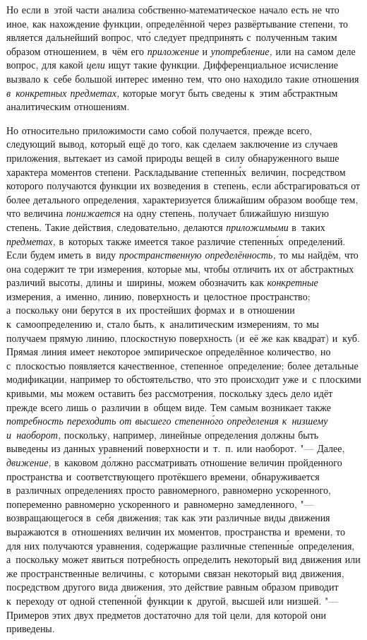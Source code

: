 Но если в~этой части анализа собственно-математическое начало есть не что иное,
как нахождение функции, определённой через развёртывание степени, то является
дальнейший вопрос, чт\'{о} следует предпринять с~полученным таким образом
отношением, в~чём его {\em приложение} и {\em употребление,} или на самом деле
вопрос, для какой {\em цели} ищут такие функции. Дифференциальное исчисление
вызвало к~себе большой интерес именно тем, что оно находило такие отношения
{\em в~конкретных предметах,} которые могут быть сведены к~этим абстрактным
аналитическим отношениям.

Но относительно приложимости само собой получается, прежде всего, следующий
вывод, который ещё до того, как сделаем заключение из случаев приложения,
вытекает из самой природы вещей в~силу обнаруженного выше характера моментов
степени. Раскладывание степенн\'{ы}х~величин, посредством которого получаются
функции их возведения в~степень, если абстрагироваться от более детального
определения, характеризуется ближайшим образом вообще тем, что величина
{\em понижается} на одну степень, получает ближайшую низшую степень. Такие
действия, следовательно, делаются {\em приложимыми} в~таких {\em предметах,}
в~которых также имеется такое различие степенн\'{ы}х~определений. Если будем
иметь в~виду {\em пространственную определённость,} то мы найдём, что она
содержит те три измерения, которые мы, чтобы отличить их от абстрактных
различий высоты, длины и~ширины, можем обозначить как {\em конкретные}
измерения, а~именно, линию, поверхность и~целостное пространство; а~поскольку
они берутся в~их простейших формах и~в отношении к~самоопределению и, стало
быть, к~аналитическим измерениям, то мы получаем прямую линию, плоскостную
поверхность (и~её же как квадрат) и~куб. Прямая линия имеет некоторое
эмпирическое определённое количество, но с~плоскостью появляется качественное,
степенн\'{о}е~определение; более детальные модификации, например то
обстоятельство, что это происходит уже и~с плоскими кривыми, мы можем оставить
без рассмотрения, поскольку здесь дело идёт прежде всего лишь о~различии
в~общем виде. Тем самым возникает также {\em потребность переходить от высшего
степенн\'{о}го определения к~низшему и~наоборот,} поскольку, например, линейные
определения должны быть выведены из данных уравнений поверхности и~т.~п. или
наоборот. "--- Далее, {\em движение,} в~каковом д\'{о}лжно рассматривать отношение
величин пройденного пространства и~соответствующего протёкшего времени,
обнаруживается в~различных определениях просто равномерного, равномерно
ускоренного, попеременно равномерно ускоренного и~равномерно замедленного, "---
возвращающегося в~себя движения; так как эти различные виды движения выражаются
в~отношениях величин их моментов, пространства и~времени, то для них получаются
уравнения, содержащие различные степенн\'{ы}е~определения, а~поскольку может
явиться потребность определить некоторый вид движения или же пространственные
величины, с~которыми связан некоторый вид движения, посредством другого вида
движения, это действие равным образом приводит к~переходу от одной
степенн\'{о}й~функции к~другой, высшей или низшей. "--- Примеров этих двух
предметов достаточно для той цели, для которой они приведены.

